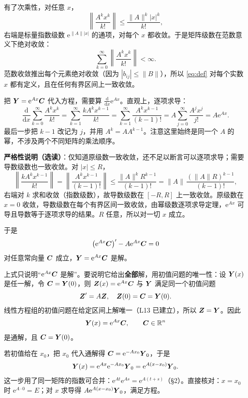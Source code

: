\documentclass[11pt]{ctexart}
\let\basesubhdr\subhdr
\renewcommand{\subhdr}[1]{\needspace{8\baselineskip}\basesubhdr{#1}}
\newcommand{\R}{\mathbb{R}}
\newcommand{\norm}[1]{\lVert #1\rVert}
\newcommand{\ee}{\mathrm{e}}
\begin{document}
有了次乘性，对任意 $x$，
\[
\left\|\frac{A^kx^k}{k!}\right\|
\le\frac{\norm{A}^k|x|^k}{k!},
\]
右端是标量指数级数 $\ee^{\norm{A}|x|}$ 的通项，对每个 $x$ 都收敛。于是矩阵级数在范数意义下绝对收敛：
\[
\sum_{k=0}^{\infty}\left\|\frac{A^kx^k}{k!}\right\|<\infty .
\]
范数收敛推出每个元素绝对收敛（因为 $|b_{ij}|\le\norm{B}$），所以 \eqref{eq:def} 对每个实数 $x$ 都有定义，且在任何有界区间上一致收敛。



把 $\vect{Y}=\ee^{Ax}\vect{C}$ 代入方程，需要算 $\frac{\mathrm{d}}{\mathrm{d}x}\ee^{Ax}$。直观上，逐项求导：
\[
\frac{\mathrm{d}}{\mathrm{d}x}\sum_{k=0}^{\infty}\frac{A^kx^k}{k!}
=\sum_{k=1}^{\infty}\frac{kA^kx^{k-1}}{k!}
=\sum_{k=1}^{\infty}\frac{A^kx^{k-1}}{(k-1)!}
=A\sum_{j=0}^{\infty}\frac{A^jx^j}{j!}
=A\ee^{Ax}.
\]
最后一步把 $k-1$ 改记为 $j$，并用 $A^k=AA^{k-1}$。注意这里始终是同一个 $A$ 的幂，不涉及两个不同矩阵的乘法顺序。

\textbf{严格性说明（选读）}：仅知道原级数一致收敛，还不足以断言可以逐项求导；需要导数级数也一致收敛。对 $|x|\le R$，
\[
\left\|\frac{kA^kx^{k-1}}{k!}\right\|
=\left\|\frac{A^kx^{k-1}}{(k-1)!}\right\|
\le\frac{\norm{A}^kR^{k-1}}{(k-1)!}
=\norm{A}\,\frac{(\norm{A}R)^{k-1}}{(k-1)!},
\]
右端对 $k$ 求和收敛（指数级数），故导数级数在 $[-R,R]$ 上一致收敛。原级数在 $x=0$ 收敛，导数级数在每个有界区间一致收敛，由幂级数逐项求导定理，$\ee^{Ax}$ 可导且导数等于逐项求导的结果。$R$ 任意，所以对一切 $x$ 成立。

于是
\[
\bigl(\ee^{Ax}\vect{C}\bigr)'-A\ee^{Ax}\vect{C}=0
\]
对任意常向量 $\boldsymbol{C}$ 成立，$\vect{Y}=\ee^{Ax}\vect{C}$ 是解。


上式只说明“$\ee^{Ax}\vect{C}$ 是解”。要说明它给出\textbf{全部}解，用初值问题的唯一性：设 $\boldsymbol{Y}(x)$ 是任一解，令 $\boldsymbol{C}=\boldsymbol{Y}(0)$，则 $\vect{Z}(x)=\ee^{Ax}\vect{C}$ 与 $\boldsymbol{Y}$ 满足同一个初值问题
\[
\boldsymbol{Z}'=A\boldsymbol{Z},\quad \boldsymbol{Z}(0)=\boldsymbol{C}=\boldsymbol{Y}(0).
\]
线性方程组的初值问题在给定区间上解唯一（L13 已建立），所以 $\boldsymbol{Z}=\boldsymbol{Y}$。因此
\[
\vect{Y}(x)=\ee^{Ax}\vect{C},\qquad \vect{C}\in\R^n
\]
是通解，且 $\boldsymbol{C}=\boldsymbol{Y}(0)$。

若初值给在 $x_0$，把 $x_0$ 代入通解得 $\vect{C}=\ee^{-Ax_0}\vect{Y}_0$，于是
\[
\vect{Y}(x)=\ee^{Ax}\ee^{-Ax_0}\vect{Y}_0
=\ee^{A(x-x_0)}\vect{Y}_0 .
\]
这一步用了同一矩阵的指数可合并：$\ee^{At}\ee^{As}=\ee^{A(t+s)}$（§2）。直接核对：$x=x_0$ 时 $\ee^{A\cdot0}=E$；对 $x$ 求导得 $A\ee^{A(x-x_0)}\vect{Y}_0$，满足方程。
\end{document}
